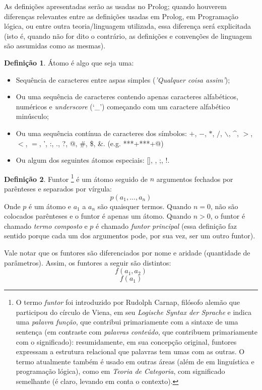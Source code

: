 \documentclass{article}
\theoremstyle{definition}
\newtheorem{definition}{Definição}[section]
\theoremstyle{remark}
\begin{document}
As definições apresentadas serão as usadas no Prolog; quando houverem diferenças relevantes entre as definições usadas em Prolog, em Programação lógica, ou entre outra teoria/linguagem utilizada, essa diferença será explicitada (isto é, quando não for dito o contrário, as definições e convenções de linguagem são assumidas como as mesmas).


  \theoremstyle{definition}
  \begin{definition}{Átomo}
  é algo que seja uma:
    \begin{itemize}
      \item Sequência de caracteres entre aspas simples (\textit{'Qualquer coisa assim'});
      \item Ou uma sequência de caracteres contendo apenas caracteres alfabéticos, numéricos e \textit{underscore} (`\_') começando com um caractere alfabético minúsculo;
      \item Ou uma sequência contínua de caracteres dos símbolos: $+$, $-$, $*$, $/$, $\backslash$, \^{}, $>$, $<$, $=$, ', :, ., ?, @, \#, \$, \&. (e.g. ***+***+@)
      \item Ou algum dos seguintes átomos especiais: [], {}, ;, !.
    \end{itemize}
  \end{definition}


  \theoremstyle{definition}
  \begin{definition}{Funtor}
    \footnote{ O termo \textit{funtor} foi introduzido por Rudolph Carnap, filósofo alemão que participou do círculo de Viena, em seu \textit{Logische Syntax der Sprache} e indica uma \textit{palavra função}, que contribui primariamente com a sintaxe de uma sentença (em contraste com \textit{palavras conteúdo}, que contribuem primariamente com o significado): resumidamente, em sua concepção original, funtores expressam a estrutura relacional que palavras tem umas com as outras. O termo atualmente também é usado em outras áreas (além de em linguística e programação lógica), como em \textit{Teoria de Categoria}, com   significado semelhante (é claro, levando em conta o contexto).  }
    é um átomo seguido de $n$ argumentos fechados por parênteses e separados por vírgula:
    \[
      p(a_1, ..., a_n)
    \]
    Onde $p$ é um átomo e $a_1$ a $a_n$ são quaisquer termos. Quando $n = 0$, não são colocados parênteses e o funtor é apenas um átomo. Quando $n > 0$, o funtor é chamado \textit{termo composto} e $p$ é chamado \textit{funtor principal} (essa definição faz sentido porque cada um dos argumentos pode, por sua vez, ser um outro funtor).
  \end{definition}
Vale notar que os funtores são diferenciados por nome e aridade (quantidade de parâmetros). Assim, os funtores a seguir são distintos:
    \[
      f(a_1, a_2)
    \]
    \[
      f(a_1)
    \]
\end{document}
